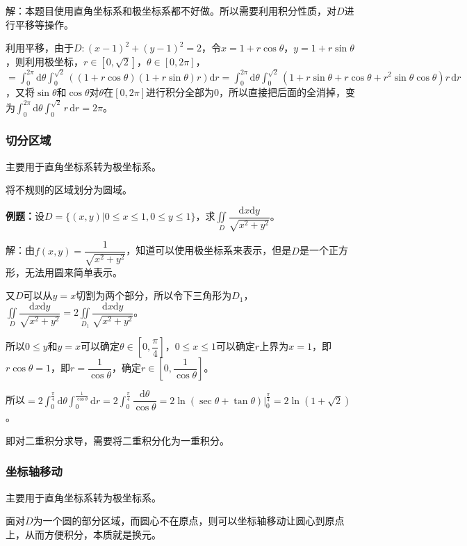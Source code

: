 \documentclass[UTF8, 12pt]{ctexart}
\begin{document}
解：本题目使用直角坐标系和极坐标系都不好做。所以需要利用积分性质，对$D$进行平移等操作。

利用平移，由于$D:(x-1)^2+(y-1)^2=2$，令$x=1+r\cos\theta$，$y=1+r\sin\theta$，则利用极坐标，$r\in[0,\sqrt{2}]$，$\theta\in[0,2\pi]$，$=\int_0^{2\pi}\textrm{d}\theta\int_0^{\sqrt{2}}((1+r\cos\theta)(1+r\sin\theta)r)\textrm{d}r=\int_0^{2\pi}\textrm{d}\theta\int_0^{\sqrt{2}}(1+r\sin\theta+r\cos\theta+r^2\sin\theta\cos\theta)r\,\textrm{d}r$，又将$\sin\theta$和$\cos\theta$对$\theta$在$[0,2\pi]$进行积分全部为0，所以直接把后面的全消掉，变为$\int_0^{2\pi}\textrm{d}\theta\int_0^{\sqrt{2}}r\,\textrm{d}r=2\pi$。

\subsubsection{切分区域}

主要用于直角坐标系转为极坐标系。

将不规则的区域划分为圆域。

\textbf{例题：}设$D=\{(x,y)|0\leqslant x\leqslant1,0\leqslant y\leqslant1\}$，求$\displaystyle{\iint\limits_D\dfrac{\textrm{d}x\textrm{d}y}{\sqrt{x^2+y^2}}}$。

解：由$f(x,y)=\dfrac{1}{\sqrt{x^2+y^2}}$，知道可以使用极坐标系来表示，但是$D$是一个正方形，无法用圆来简单表示。

又$D$可以从$y=x$切割为两个部分，所以令下三角形为$D_1$，$\displaystyle{\iint\limits_D\dfrac{\textrm{d}x\textrm{d}y}{\sqrt{x^2+y^2}}}=2\displaystyle{\iint\limits_{D_1}\dfrac{\textrm{d}x\textrm{d}y}{\sqrt{x^2+y^2}}}$。

所以$0\leqslant y$和$y=x$可以确定$\theta\in\left[0,\dfrac{\pi}{4}\right]$，$0\leqslant x\leqslant1$可以确定$r$上界为$x=1$，即$r\cos\theta=1$，即$r=\dfrac{1}{\cos\theta}$，确定$r\in\left[0,\dfrac{1}{\cos\theta}\right]$。

所以$=2\int_0^{\frac{\pi}{4}}\textrm{d}\theta\int_0^{\frac{1}{\cos\theta}}\textrm{d}r=2\int_0^{\frac{\pi}{4}}\dfrac{\textrm{d}\theta}{\cos\theta}=2\ln(\sec\theta+\tan\theta)|_0^{\frac{\pi}{4}}=2\ln(1+\sqrt{2})$。

即对二重积分求导，需要将二重积分化为一重积分。

\subsubsection{坐标轴移动}

主要用于直角坐标系转为极坐标系。

面对$D$为一个圆的部分区域，而圆心不在原点，则可以坐标轴移动让圆心到原点上，从而方便积分，本质就是换元。
\end{document}
